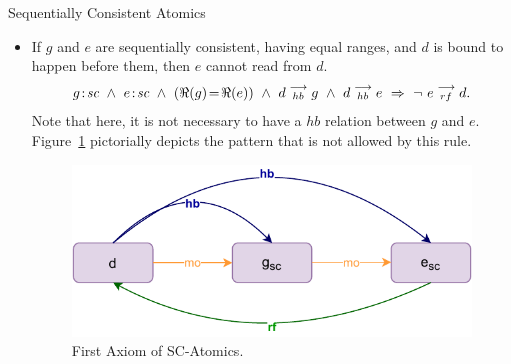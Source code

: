 \begin{axiom}{Sequentially Consistent Atomics}
\begin{itemize}
                \item If $g$ and $e$ are sequentially consistent, having equal ranges, and $d$ is bound to happen before them, then $e$ cannot read from $d$.
                    \begin{align*}
                        \et{g}{sc}\ \wedge\ \et{e}{sc}  
                        \ \wedge \ (\Re(g) \!= \!\Re(e)) 
                        \ \wedge \ \reln{d}{hb}{g} 
                        \ \wedge \ \reln{d}{hb}{e}
                        \ \Rightarrow \ 
                        \neg \ \reln{e}{rf}{d}.
                    \end{align*}
                    Note that here, it is not necessary to have a $hb$ relation between $g$ and $e$.
                    Figure~\ref{model:sc_atomics(3)} pictorially depicts the pattern that is not allowed by this rule.
                    \begin{figure}[H]
                        \centering 
                        \includegraphics[scale=0.7]{3.ECMAScriptMemoryModel/SequentialAtomics2.pdf}
                        \caption{First Axiom of SC-Atomics.}
                        \label{model:sc_atomics(3)}
                    \end{figure}
                        
            \end{itemize}
        \end{axiom} 
        